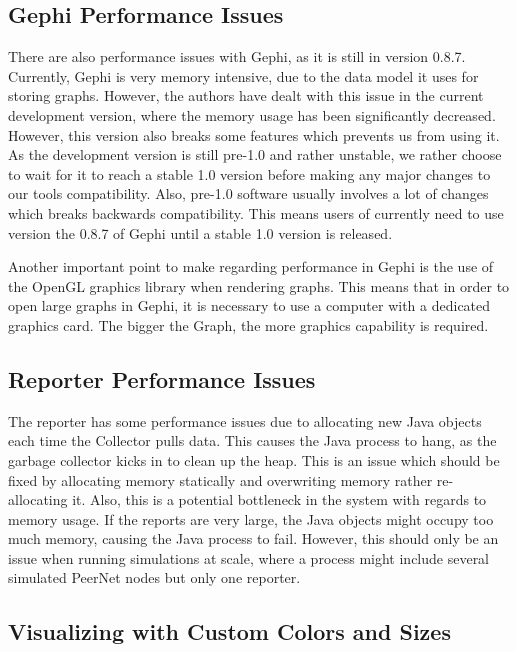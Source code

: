 \subsection{Gephi Performance Issues}

There are also performance issues with Gephi, as it is still in version
0.8.7. Currently, Gephi is very memory intensive, due to the data model
it uses for storing graphs. However, the authors have dealt with this
issue in the current development version, where the memory usage has
been significantly decreased. However, this version also breaks some
features which prevents us from using it. As the development version is
still pre-1.0 and rather unstable, we rather choose to wait for it to
reach a stable 1.0 version before making any major changes to our tools
compatibility. Also, pre-1.0 software usually involves a lot of changes
which breaks backwards compatibility. This means users of \demo{}
currently need to use version the 0.8.7 of Gephi until a stable 1.0
version is released.

Another important point to make regarding performance in Gephi is the
use of the OpenGL graphics library when rendering graphs. This means
that in order to open large graphs in Gephi, it is necessary to use a
computer with a dedicated graphics card. The bigger the Graph, the more
graphics capability is required.

\subsection{Reporter Performance Issues}

The reporter has some performance issues due to allocating new Java
objects each time the Collector pulls data. This causes the Java process to
hang, as the garbage collector kicks in to clean up the heap. This is an
issue which should be fixed by allocating memory statically and
overwriting memory rather re-allocating it. Also, this is a potential bottleneck
in the system with regards to memory usage. If the reports are very large, the Java
objects might occupy too much  memory, causing the Java process to
fail. However, this should only be an issue when  running simulations at
scale, where a process might include several simulated PeerNet nodes but only one
reporter.

\subsection{Visualizing with Custom Colors and Sizes}

